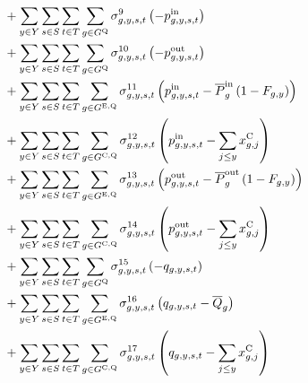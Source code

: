 \documentclass{article}
\begin{document}
\begin{align}
		& + \sum\limits_{\iYear \in \sYears}\sum\limits_{\iScenario \in \sScenarios}\sum\limits_{\iInterval \in \sIntervals} \sum\limits_{\iGenerator \in \sStorage} \dNonNegativeCharging \left(-\vPowerIn\right)\\
		& + \sum\limits_{\iYear \in \sYears}\sum\limits_{\iScenario \in \sScenarios}\sum\limits_{\iInterval \in \sIntervals} \sum\limits_{\iGenerator \in \sStorage} \dNonNegativeDischarging \left(-\vPowerOut\right)\\
		& + \sum\limits_{\iYear \in \sYears}\sum\limits_{\iScenario \in \sScenarios}\sum\limits_{\iInterval \in \sIntervals} \sum\limits_{\iGenerator \in \sStorageExisting} \dMaxChargingRateExisting \left(\vPowerIn - \cPowerChargingMax \left(1 - \cRetirementIndicator\right) \right)\\
		& + \sum\limits_{\iYear \in \sYears}\sum\limits_{\iScenario \in \sScenarios}\sum\limits_{\iInterval \in \sIntervals} \sum\limits_{\iGenerator \in \sStorageCandidate} \dMaxChargingRateCandidate \left(\vPowerIn - \sum\limits_{\iYearAlias \leq \iYear} \vInstalledCapacity[\iGenerator,\iYearAlias]\right)\\
		& + \sum\limits_{\iYear \in \sYears}\sum\limits_{\iScenario \in \sScenarios}\sum\limits_{\iInterval \in \sIntervals} \sum\limits_{\iGenerator \in \sStorageExisting} \dMaxDischargingRateExisting \left(\vPowerOut - \cPowerDischargingMax \left(1 - \cRetirementIndicator\right)\right)\\
		& + \sum\limits_{\iYear \in \sYears}\sum\limits_{\iScenario \in \sScenarios}\sum\limits_{\iInterval \in \sIntervals} \sum\limits_{\iGenerator \in \sStorageCandidate} \dMaxDischargingRateCandidate \left(\vPowerOut - \sum\limits_{\iYearAlias \leq \iYear} \vInstalledCapacity[\iGenerator,\iYearAlias]\right)\\
		& + \sum\limits_{\iYear \in \sYears}\sum\limits_{\iScenario \in \sScenarios}\sum\limits_{\iInterval \in \sIntervals} \sum\limits_{\iGenerator \in \sStorage} \dNonNegativeStorageEnergy \left(- \vStorageUnitEnergy\right)\\
		& + \sum\limits_{\iYear \in \sYears}\sum\limits_{\iScenario \in \sScenarios}\sum\limits_{\iInterval \in \sIntervals} \sum\limits_{\iGenerator \in \sStorageExisting} \dMaxStorageEnergyExisting \left(\vStorageUnitEnergy - \cStorageUnitEnergyMax\right)\\
		& + \sum\limits_{\iYear \in \sYears}\sum\limits_{\iScenario \in \sScenarios}\sum\limits_{\iInterval \in \sIntervals} \sum\limits_{\iGenerator \in \sStorageCandidate} \dMaxStorageEnergyCandidate \left(\vStorageUnitEnergy - \sum\limits_{\iYearAlias \leq \iYear} \vInstalledCapacity[\iGenerator,\iYearAlias]\right)\\

\end{align}
\end{document}
